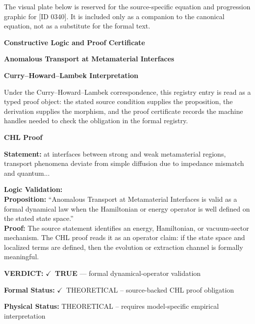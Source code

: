 \begingroup\footnotesize\sloppy
The visual plate below is reserved for the source-specific equation and progression graphic for [ID 0340]. It is included only as a companion to the canonical equation, not as a substitute for the formal text.
\par\endgroup
\ifTZPDarkEdition
{}
\fi

\clearpage
\begingroup\tzpsupportsetup
\noindent\textbf{\fontsize{10.8pt}{12.8pt}\selectfont [ID 0340] Constructive Logic and Proof Certificate}\par
\noindent\textbf{\fontsize{10pt}{12pt}\selectfont Anomalous Transport at Metamaterial Interfaces}\par
\vspace{0.45em}
\begingroup
\footnotesize
\setlength{\parskip}{0.22em}
\setlength{\parindent}{0pt}
\noindent\textbf{Curry--Howard--Lambek Interpretation}\par
Under the Curry--Howard--Lambek correspondence, this registry entry is read as a typed proof
object: the stated source condition supplies the proposition, the derivation supplies the
morphism, and the proof certificate records the machine handles needed to check the obligation
in the formal registry.

\vspace{0.45em}
\noindent\textbf{CHL Proof}\par
\textbf{Statement:} at interfaces between strong and weak metamaterial regions, transport phenomena deviate
from simple diffusion due to impedance mismatch and quantum...

\textbf{Logic Validation:}\\
\textbf{Proposition:} ``Anomalous Transport at Metamaterial Interfaces is valid as a formal dynamical law when
the Hamiltonian or energy operator is well defined on the stated state space.''\\
\textbf{Proof:} The source statement identifies an energy, Hamiltonian, or vacuum-sector mechanism. The
CHL proof reads it as an operator claim: if the state space and localized terms are
defined, then the evolution or extraction channel is formally meaningful.

\textbf{VERDICT:} \ensuremath{\checkmark}\ \textbf{TRUE} --- formal dynamical-operator validation

\textbf{Formal Status:} \ensuremath{\checkmark}\ THEORETICAL -- source-backed CHL proof obligation

\textbf{Physical Status:} THEORETICAL -- requires model-specific empirical interpretation
\par\vspace{0.45em}
\par
\ifTZPDarkEdition
{}
\fi
\endgroup
\endgroup
